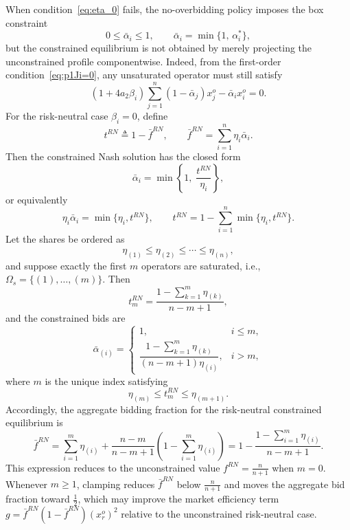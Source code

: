 \documentclass[conference]{IEEEtran}
\begin{document}
When condition~\eqref{eq:eta_0} fails, the no-overbidding policy imposes the box constraint
\begin{equation}
0\le \bar{\alpha}_i \le 1,\qquad
\bar{\alpha}_i = \min\{1,\, \alpha_i^*\}, \label{eq:alpha_clamp}
\end{equation}
but the constrained equilibrium is not obtained by merely projecting the unconstrained profile componentwise. Indeed, from the first-order condition~\eqref{eq:p1Ji=0}, any unsaturated operator must still satisfy
\[
(1+4a_2\beta_i)\sum_{j=1}^n(1-\bar{\alpha}_j)x_j^o-\bar{\alpha}_i x_i^o=0.
\]
For the risk-neutral case $\beta_i=0$, define
\[
t^{RN}\triangleq 1-\bar{f}^{RN},\qquad
\bar{f}^{RN}=\sum_{i=1}^n \eta_i\bar{\alpha}_i .
\]
Then the constrained Nash solution has the closed form
\begin{equation}
\bar{\alpha}_i=
\min\!\left\{1,\;\frac{t^{RN}}{\eta_i}\right\},
\label{eq:alpha_clamp_RN_closed}
\end{equation}
or equivalently
\[
\eta_i\bar{\alpha}_i=\min\{\eta_i,t^{RN}\},\qquad
t^{RN}=1-\sum_{i=1}^n \min\{\eta_i,t^{RN}\}.
\]
Let the shares be ordered as
\[
\eta_{(1)}\le \eta_{(2)}\le \cdots \le \eta_{(n)},
\]
and suppose exactly the first $m$ operators are saturated, i.e.,
$\Omega_s=\{(1),\ldots,(m)\}$. Then
\begin{equation}
t_m^{RN}=
\frac{1-\sum_{k=1}^m \eta_{(k)}}{n-m+1},
\label{eq:tbar_RN}
\end{equation}
and the constrained bids are
\begin{equation}
\bar{\alpha}_{(i)}=
\left\{
\begin{array}{ll}
1, & i\le m,\\[2mm]
\dfrac{1-\sum_{k=1}^m\eta_{(k)}}{(n-m+1)\eta_{(i)}}, & i>m,
\end{array}
\right.
\label{eq:alpha_bar_RN_active}
\end{equation}
where $m$ is the unique index satisfying
\[
\eta_{(m)}\le t_m^{RN}\le \eta_{(m+1)}.
\]
Accordingly, the aggregate bidding fraction for the risk-neutral constrained equilibrium is
\begin{equation}
\bar{f}^{RN}
=
\sum_{i=1}^m\eta_{(i)}
+
\frac{n-m}{n-m+1}
\left(1-\sum_{i=1}^m\eta_{(i)}\right)
=
1-\frac{1-\sum_{i=1}^m\eta_{(i)}}{n-m+1}.
\label{eq:fbar_RN}
\end{equation}
This expression reduces to the unconstrained value $f^{RN}=\frac{n}{n+1}$ when $m=0$. Whenever $m\ge 1$, clamping reduces $\bar{f}^{RN}$ below $\frac{n}{n+1}$ and moves the aggregate bid fraction toward $\frac{1}{2}$, which may improve the market efficiency term $g=\bar{f}^{RN}(1-\bar{f}^{RN})(x_r^o)^2$ relative to the unconstrained risk-neutral case.
\end{document}
